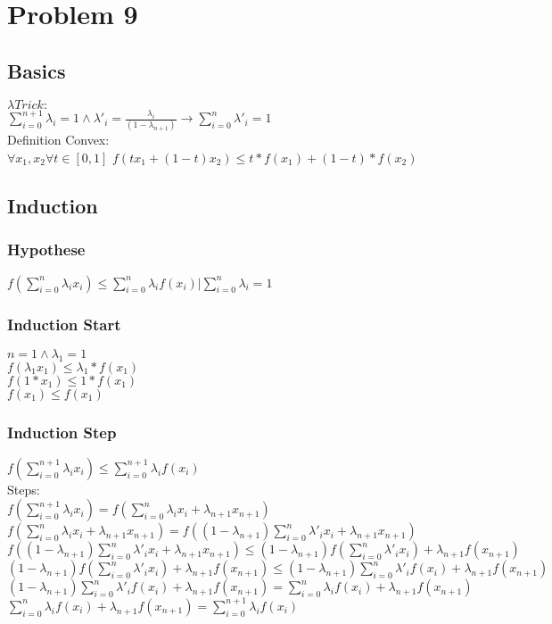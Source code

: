\section{Problem 9}
\subsection{Basics}
$\lambda Trick:$ \\
$\sum_{i=0}^{n+1} {\lambda_i} = 1  \wedge \lambda'_i = \frac{\lambda_i}{(1-\lambda_{n+1})} \rightarrow \sum_{i=0}^{n} {\lambda'_i} = 1  $ \\ 
Definition Convex: \\ 
$\forall x_1, x_2  \forall t \in [0,1]$ $ f(tx_1 + (1-t) x_2) \leq t*f(x_1) +(1-t)*f(x_2) $
\subsection{Induction}
\subsubsection{Hypothese}
$ f(\sum_{i=0}^{n} {\lambda_i x_i} ) \leq \sum_{i=0}^{n} {\lambda_i f(x_i)} | \sum_{i=0}^{n} {\lambda_i} = 1 $
\subsubsection{Induction Start}
$n = 1 \wedge \lambda_1 = 1 $ \\
$f(\lambda_1x_1) \leq \lambda_1 * f(x_1) $ \\
$f(1*x_1) \leq 1 * f(x_1) $ \\
$f(x_1) \leq f(x_1) $

\subsubsection{Induction Step}

$ f(\sum_{i=0}^{n+1} {\lambda_i x_i} ) \leq \sum_{i=0}^{n+1} {\lambda_i f(x_i)}  $ \\
Steps:\\
$   f(\sum_{i=0}^{n+1} {\lambda_i x_i} )  = f(\sum_{i=0}^{n} {\lambda_i x_i} + \lambda_{n+1}x_{n+1} ) $\\
$f(\sum_{i=0}^{n} {\lambda_i x_i} + \lambda_{n+1}x_{n+1} ) = f((1-\lambda_{n+1}) \sum_{i=0}^{n} {\lambda'_i x_i} + \lambda_{n+1}x_{n+1} )  $\\
$f((1-\lambda_{n+1}) \sum_{i=0}^{n} {\lambda'_i x_i} + \lambda_{n+1}x_{n+1} ) \leq (1-\lambda_{n+1}) f(\sum_{i=0}^{n} {\lambda'_i x_i}) + \lambda_{n+1}f(x_{n+1})$\\ 
$(1-\lambda_{n+1}) f(\sum_{i=0}^{n} {\lambda'_i x_i}) + \lambda_{n+1}f(x_{n+1}) \leq (1-\lambda_{n+1}) \sum_{i=0}^{n} {\lambda'_i f(x_i)} + \lambda_{n+1}f(x_{n+1})$\\
$(1-\lambda_{n+1}) \sum_{i=0}^{n} {\lambda'_i f(x_i)} + \lambda_{n+1}f(x_{n+1}) = \sum_{i=0}^{n} {\lambda_i f(x_i)} + \lambda_{n+1}f(x_{n+1})$\\
 $\sum_{i=0}^{n} {\lambda_i f(x_i)} + \lambda_{n+1}f(x_{n+1})= \sum_{i=0}^{n+1} {\lambda_i f(x_i)}$